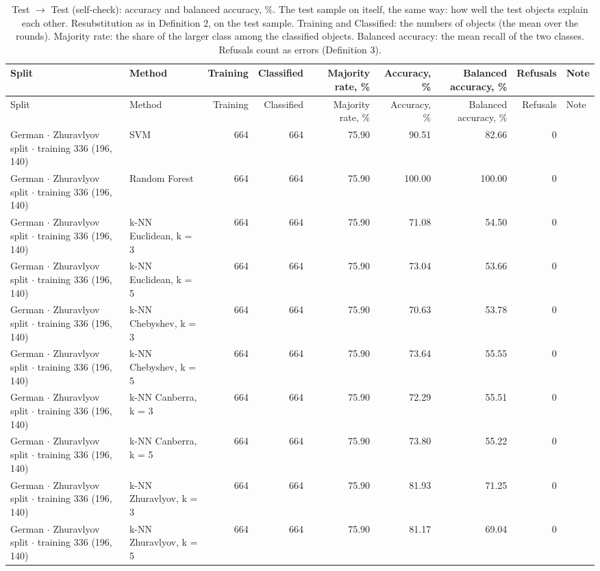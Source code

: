 \begin{longtable}{llrrrrrrl}
  \caption{Test $\to$ Test (self-check): accuracy and balanced accuracy, \%. The test sample on itself, the same way: how well the test objects explain each other. Resubstitution as in Definition 2, on the test sample. Training and Classified: the numbers of objects (the mean over the rounds). Majority rate: the share of the larger class among the classified objects. Balanced accuracy: the mean recall of the two classes. Refusals count as errors (Definition 3).}\label{tab:test-self} \\
  \toprule
  Split & Method & Training & Classified & Majority rate, \% & Accuracy, \% & Balanced accuracy, \% & Refusals & Note \\
  \midrule
  \endfirsthead
  \toprule
  Split & Method & Training & Classified & Majority rate, \% & Accuracy, \% & Balanced accuracy, \% & Refusals & Note \\
  \midrule
  \endhead
  \bottomrule
  \endfoot
  German $\cdot$ Zhuravlyov split $\cdot$ training 336 (196, 140) & SVM & 664 & 664 & 75.90 & 90.51 & 82.66 & 0 &  \\
  German $\cdot$ Zhuravlyov split $\cdot$ training 336 (196, 140) & Random Forest & 664 & 664 & 75.90 & 100.00 & 100.00 & 0 &  \\
  German $\cdot$ Zhuravlyov split $\cdot$ training 336 (196, 140) & k-NN Euclidean, k = 3 & 664 & 664 & 75.90 & 71.08 & 54.50 & 0 &  \\
  German $\cdot$ Zhuravlyov split $\cdot$ training 336 (196, 140) & k-NN Euclidean, k = 5 & 664 & 664 & 75.90 & 73.04 & 53.66 & 0 &  \\
  German $\cdot$ Zhuravlyov split $\cdot$ training 336 (196, 140) & k-NN Chebyshev, k = 3 & 664 & 664 & 75.90 & 70.63 & 53.78 & 0 &  \\
  German $\cdot$ Zhuravlyov split $\cdot$ training 336 (196, 140) & k-NN Chebyshev, k = 5 & 664 & 664 & 75.90 & 73.64 & 55.55 & 0 &  \\
  German $\cdot$ Zhuravlyov split $\cdot$ training 336 (196, 140) & k-NN Canberra, k = 3 & 664 & 664 & 75.90 & 72.29 & 55.51 & 0 &  \\
  German $\cdot$ Zhuravlyov split $\cdot$ training 336 (196, 140) & k-NN Canberra, k = 5 & 664 & 664 & 75.90 & 73.80 & 55.22 & 0 &  \\
  German $\cdot$ Zhuravlyov split $\cdot$ training 336 (196, 140) & k-NN Zhuravlyov, k = 3 & 664 & 664 & 75.90 & 81.93 & 71.25 & 0 &  \\
  German $\cdot$ Zhuravlyov split $\cdot$ training 336 (196, 140) & k-NN Zhuravlyov, k = 5 & 664 & 664 & 75.90 & 81.17 & 69.04 & 0 &  \\

\end{longtable}
